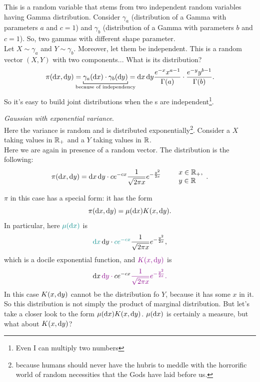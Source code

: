 \documentclass{report}
\begin{document}
\begin{example}
	This is a random variable that stems from two independent random variables having Gamma distribution. Consider $\gamma_a$ (distribution of a Gamma \rv{} with parameters $a$ and $c=1$) and $\gamma_b$ (distribution of a Gamma \rv{} with parameters $b$ and $c=1$). So, two gammas with different shape parameter. \\
	Let $X\sim\gamma_a$ and $Y\sim\gamma_b$. Moreover, let them be independent. This is a random vector $(X,Y)$ with two components... What is its distribution?
	\[\pi(\dx,\dy)=\underbracket[0.6pt]{\gamma_a(\dx)\cdot\gamma_b(\dy)}_{\mathclap{\text{because of independency}}}=\dx\dy\frac{e^{-x}x^{a-1}}{\Gamma(a)}\cdot\frac{e^{-y}y^{b-1}}{\Gamma(b)}.\]
	So it's easy to build joint distributions when the \rv s are independent\footnote{Even I can multiply two numbers}.
\end{example}
\begin{example}
	\emph{Gaussian \rv{} with exponential variance}.\\
	Here the variance is random and is distributed exponentially\footnote{because humans should never have the hubris to meddle with the horrorific world of random necessities that the Gods have laid before us.}. Consider a \rv{} $X$ taking values in $\mathbb{R}_+$ and a \rv{} $Y$ taking values in $\mathbb{R}$.\\
	Here we are again in presence of a random vector. The distribution is the following:
	\[\pi(\mathop{}\!\mathrm{d} x,\mathop{}\!\mathrm{d} y)=\mathop{}\!\mathrm{d} x\mathop{}\!\mathrm{d} y\cdot ce^{-cx}\frac{1}{\sqrt{2\pi x}}e^{-\frac{y^2}{2x}}\qquad \begin{array}{l}
		x\in\mathbb{R}_+,\\
		y\in\mathbb{R}
	\end{array}. \]
	\begin{remark}
		$\pi$ in this case has a special form: it has the form 
		\[\pi(\mathop{}\!\mathrm{d} x,\mathop{}\!\mathrm{d} y)=\mu(\mathop{}\!\mathrm{d} x)K(x,\mathop{}\!\mathrm{d} y).\]
		In particular, here $\color{Cyan4}\mu(\dx)$ is 
		\[\color{Cyan4}\dx\color{black}\dy\cdot\color{Cyan4} ce^{-cx}\color{black}\frac{1}{\sqrt{2\pi x}}e^{-\frac{y^2}{2x}},\]
		which is a docile exponential function, and $\color{Magenta4}K(x,\dy)$ is
		\[\color{black}\dx\color{Magenta4}\dy\cdot\color{black} ce^{-cx}\color{Magenta4}\frac{1}{\sqrt{2\pi x}}e^{-\frac{y^2}{2x}}.\]
		In this case $K(x,\mathop{}\!\mathrm{d} y)$ cannot be the distribution fo $Y$, because it has some $x$ in it. So this distribution is not simply the product of marginal distribution. But let's take a closer look to the form $\mu(\mathop{}\!\mathrm{d} x)K(x,\mathop{}\!\mathrm{d} y)$. $\mu(\mathop{}\!\mathrm{d} x)$ is certainly a measure, but what about $K(x,\mathop{}\!\mathrm{d} y)$? \par
	\end{remark}
\end{example}
\end{document}
